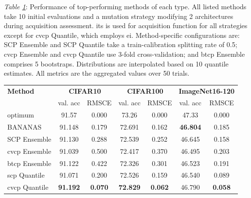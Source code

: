 \documentclass[a4paper,oneside,bibliography=totoc]{scrbook}
\begin{document}
\begin{table}[t]

\parbox{\linewidth}{
  {\small \textit{Table \ref{tab: summary}}: Performance of top-performing methods of each type. All listed methods take 10 initial evaluations and a mutation strategy modifying 2 architectures during acquisition assessment. \gls{its} is used for acquisition function for all strategies except for \gls{cvcp} Quantile, which employs \gls{ei}. Method-specific configurations are: SCP Ensemble and SCP Quantile take a train-calibration splitting rate of 0.5; \gls{cvcp} Ensemble and \gls{cvcp} Quantile use 3-fold cross-validation; and \gls{btcp} Ensemble comprises 5 bootstraps. Distributions are interpolated based on 10 quantile estimates. All metrics are the aggregated values over 50 trials.}  
  \vspace{1em}
}
\label{tab: summary}
\centering
\small
\renewcommand{\arraystretch}{1.3}
\begin{tabular}{l|cc|cc|cc}
\toprule
\textbf{Method} 
& \multicolumn{2}{c|}{\textbf{CIFAR10}} 
& \multicolumn{2}{c|}{\textbf{CIFAR100}} 
& \multicolumn{2}{c}{\textbf{ImageNet16-120}} \\
& val. acc & RMSCE & val. acc & RMSCE & val. acc & RMSCE \\
\midrule
optimum 
& 91.57 & 0.000 
& 73.26 & 0.000 
& 47.33 & 0.000 \\
\midrule
BANANAS
& 91.148 & 0.179 
& 72.691 & 0.162 
& \textbf{46.804} & 0.185 \\
SCP Ensemble 
& 91.130 & 0.288 
& 72.539 & 0.252 
& 46.645 & 0.158 \\
\gls{cvcp} Ensemble
& 91.039 & 0.500 
& 72.417 & 0.370 
& 46.495 & 0.203 \\
\gls{btcp} Ensemble
& 91.122 & 0.422 
& 72.326 & 0.301 
& 46.523 & 0.191 \\
\gls{scp} Quantile
& 91.071 & 0.200 
& 72.526 & 0.159 
& 46.540 & 0.089 \\
\gls{cvcp} Quantile 
& \textbf{91.192} & \textbf{0.070} 
& \textbf{72.829} & \textbf{0.062} 
& 46.790 & \textbf{0.058} \\
\bottomrule
\end{tabular}
\end{table}
\end{document}
